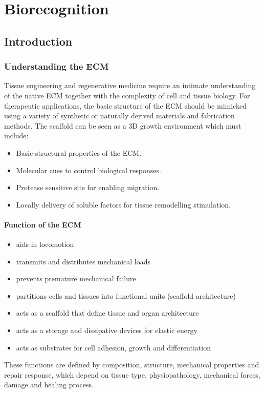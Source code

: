 \graphicspath{{chapters/05/images/}}
\chapter{Biorecognition}

\section{Introduction}

	\subsection{Understanding the ECM}
	Tissue engineering and regenerative medicine require an intimate understanding of the native ECM together with the complexity of cell and tissue biology.
	For therapeutic applications, the basic structure of the ECM should be mimicked using a variety of synthetic or naturally derived materials and fabrication methods.
	The scaffold can be seen as a 3D growth environment which must include:

	\begin{multicols}{2}
		\begin{itemize}
			\item Basic structural properties of the ECM.
			\item Molecular cues to control biological responses.
			\item Protease sensitive site for enabling migration.
			\item Locally delivery of soluble factors for tissue remodelling stimulation.
		\end{itemize}
	\end{multicols}

		\subsubsection{Function of the ECM}
		\begin{itemize}
		\item aids in locomotion
		\item transmits and distributes mechanical loads
		\item prevents premature mechanical failure
		\item partitions cells and tissues into functional units (scaffold architecture)
		\item acts as a scaffold that define tissue and organ architecture
		\item acts as a storage and dissipative devices for elastic energy
		\item acts as substrates for cell adhesion, growth and differentiation
		\end{itemize}
		These functions are defined by composition, structure, mechanical properties and repair response, which depend on tissue type, physiopathology, mechanical forces, damage and healing process.

